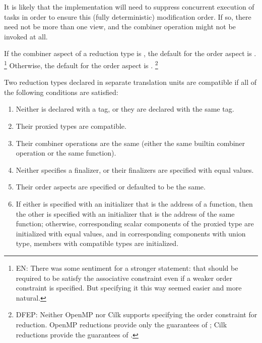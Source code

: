 \begin{description}
\begin{note}
It is likely that the implementation
will need to suppress concurrent execution of tasks
in order to ensure this (fully deterministic) modification order.
If so, there need not be more than one view,
and the combiner operation might not be invoked at all. 
\end{note}

\end{description}

\pnum
If the combiner aspect of a reduction type is
,
the default for the order aspect is
.%
\footnote{EN:
There was some sentiment for a stronger statement: that
should be required to be satisfy the associative constraint
even if a weaker order constraint is specified.
But specifying it this way seemed easier and more natural.
}
Otherwise, the default for the order aspect is
.
\footnote{DFEP:
Neither OpenMP nor Cilk supports specifying the order constraint for reduction.
OpenMP reductions provide only the guarantees of
;
Cilk reductions provide the guarantees of
.
}

\pnum
Two reduction types declared in separate translation units
are compatible if all of the following conditions are satisfied:

\begin{enumerate}
\item
Neither is declared with a tag, or they are declared with the same tag.
\item
Their proxied types are compatible.
\item
Their combiner operations are the same
(either the same builtin combiner operation or the same function).
\item
Neither specifies a finalizer,
or their finalizers are specified with equal values.
\item
Their order aspects are specified or defaulted to be the same.
\item
If either is specified with an initializer that is the address of a function,
then the other is specified with an initializer
that is the address of the same function;
otherwise, corresponding scalar components of the proxied type
are initialized with equal values,
and in corresponding components with union type,
members with compatible types are initialized.
\end{enumerate}



